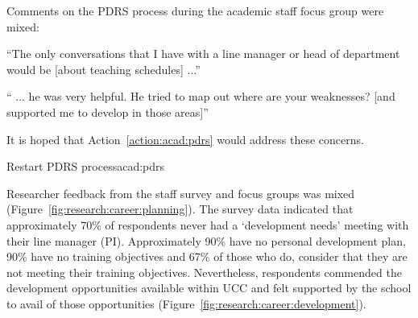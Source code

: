 \pagebreak
Comments on the \ac{PDRS} process during the academic staff focus group were mixed:

\begin{myquote}
``The only conversations that I have with a line manager or head of department would be [about teaching schedules] ...''
\end{myquote}

\begin{myquote}
`` ... he was very helpful. He tried to map out where are your weaknesses? [and supported me to develop in those areas]''
\end{myquote}



It is hoped that Action~\ref{action:acad:pdrs} would address these concerns.


\begin{actionblock}{\ksspace{}Restart PDRS process}{acad:pdrs}
\actrestartpdrs
\hfill{
    \hypersetup{hidelinks}
    \hyperlink{c13}{\gotoactionsymbol{}}
}
\end{actionblock}

Researcher feedback from the staff survey and focus groups was mixed (Figure~\ref{fig:research:career:planning}). The survey data indicated that approximately 70\% of respondents never had a `development needs' meeting with their line manager (PI). Approximately 90\%  have no personal development plan, 90\% have no training objectives and 67\% of those who do, consider that they are not meeting their training objectives.
Nevertheless, respondents commended the development opportunities available within UCC and felt supported by the school to avail of those opportunities (Figure~\ref{fig:research:career:development}). 



